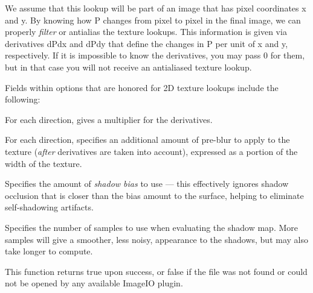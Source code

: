 We assume that this lookup will be part of an image that has pixel
coordinates {\cf x} and {\cf y}.  By knowing how {\cf P} changes from
pixel to pixel in the final image, we can properly \emph{filter} or
antialias the texture lookups.  This information is given via
derivatives {\cf dPdx} and {\cf dPdy} that define the changes in {\cf P}
per unit of {\cf x} and {\cf y}, respectively.  If it is impossible to
know the derivatives, you may pass 0 for them, but in that case you will
not receive an antialiased texture lookup.

Fields within {\cf options} that are honored for 2D texture lookups
include the following:

\vspace{-12pt}
\vspace{10pt}
For each direction, gives a multiplier for the derivatives.
\apiend

\vspace{-24pt}
\vspace{10pt}
For each direction, specifies an additional amount of pre-blur to apply
to the texture (\emph{after} derivatives are taken into account),
expressed as a portion of the width of the texture.
\apiend

\vspace{-24pt}
\vspace{10pt}
Specifies the amount of \emph{shadow bias} to use --- this effectively
ignores shadow occlusion that is closer than the bias amount to the
surface, helping to eliminate self-shadowing artifacts.
\apiend

\vspace{-24pt}
\vspace{10pt}
Specifies the number of samples to use when evaluating the shadow map.
More samples will give a smoother, less noisy, appearance to the
shadows, but may also take longer to compute.
\apiend

This function returns {\cf true} upon success, or {\cf false} if the
file was not found or could not be opened by any available ImageIO
plugin.
\apiend


